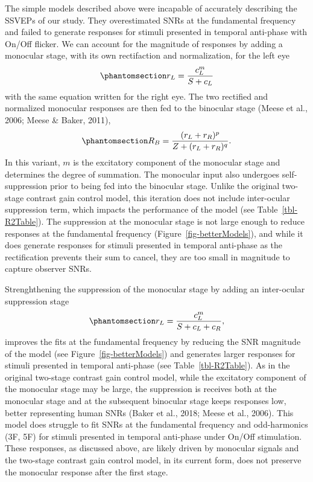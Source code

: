 \documentclass[
  12pt,
]{article}
\begin{document}
The simple models described above were incapable of accurately
describing the SSVEPs of our study. They overestimated SNRs at the
fundamental frequency and failed to generate responses for stimuli
presented in temporal anti-phase with On/Off flicker. We can account for
the magnitude of responses by adding a monocular stage, with its own
rectifaction and normalization, for the left eye
\begin{equation}\phantomsection\label{eq-firstStageofTwoNoInter}{
r_L = \frac{c_L^m}{S + c_L}
}\end{equation} with the same equation written for the right eye. The
two rectified and normalized monocular responses are then fed to the
binocular stage (Meese et al., 2006; Meese \& Baker, 2011),
\begin{equation}\phantomsection\label{eq-binocComb}{
R_{B} = \frac{(r_L+r_R)^p}{Z+(r_L+r_R)^q}.
}\end{equation} In this variant, \(m\) is the excitatory component of
the monocular stage and determines the degree of summation. The
monocular input also undergoes self-suppression prior to being fed into
the binocular stage. Unlike the original two-stage contrast gain control
model, this iteration does not include inter-ocular suppression term,
which impacts the performance of the model (see
Table~\ref{tbl-R2Table}). The suppression at the monocular stage is not
large enough to reduce responses at the fundamental frequency
(Figure~\ref{fig-betterModels}), and while it does generate responses
for stimuli presented in temporal anti-phase as the rectification
prevents their sum to cancel, they are too small in magnitude to capture
observer SNRs.

Strenghthening the suppression of the monocular stage by adding an
inter-ocular suppression stage
\begin{equation}\phantomsection\label{eq-firstStageofTwo}{
r_{L} = \frac{c_L^m}{S + c_L + c_R},
}\end{equation} improves the fits at the fundamental frequency by
reducing the SNR magnitude of the model (see
Figure~\ref{fig-betterModels}) and generates larger responses for
stimuli presented in temporal anti-phase (see Table~\ref{tbl-R2Table}).
As in the original two-stage contrast gain control model, while the
excitatory component of the monocular stage may be large, the
suppression is receives both at the monocular stage and at the
subsequent binocular stage keeps responses low, better representing
human SNRs (Baker et al., 2018; Meese et al., 2006). This model does
struggle to fit SNRs at the fundamental frequency and odd-harmonics (3F,
5F) for stimuli presented in temporal anti-phase under On/Off
stimulation. These responses, as discussed above, are likely driven by
monocular signals and the two-stage contrast gain control model, in its
current form, does not preserve the monocular response after the first
stage.
\end{document}
